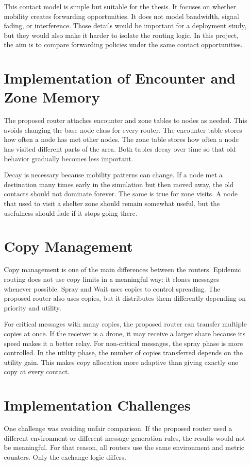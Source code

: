 This contact model is simple but suitable for the thesis. It focuses on whether mobility creates forwarding opportunities. It does not model bandwidth, signal fading, or interference. Those details would be important for a deployment study, but they would also make it harder to isolate the routing logic. In this project, the aim is to compare forwarding policies under the same contact opportunities.

\section{Implementation of Encounter and Zone Memory}
The proposed router attaches encounter and zone tables to nodes as needed. This avoids changing the base node class for every router. The encounter table stores how often a node has met other nodes. The zone table stores how often a node has visited different parts of the area. Both tables decay over time so that old behavior gradually becomes less important.

Decay is necessary because mobility patterns can change. If a node met a destination many times early in the simulation but then moved away, the old contacts should not dominate forever. The same is true for zone visits. A node that used to visit a shelter zone should remain somewhat useful, but the usefulness should fade if it stops going there.

\section{Copy Management}
Copy management is one of the main differences between the routers. Epidemic routing does not use copy limits in a meaningful way; it clones messages whenever possible. Spray and Wait uses copies to control spreading. The proposed router also uses copies, but it distributes them differently depending on priority and utility.

For critical messages with many copies, the proposed router can transfer multiple copies at once. If the receiver is a drone, it may receive a larger share because its speed makes it a better relay. For non-critical messages, the spray phase is more controlled. In the utility phase, the number of copies transferred depends on the utility gain. This makes copy allocation more adaptive than giving exactly one copy at every contact.

\section{Implementation Challenges}
One challenge was avoiding unfair comparison. If the proposed router used a different environment or different message generation rules, the results would not be meaningful. For that reason, all routers use the same environment and metric counters. Only the exchange logic differs.


